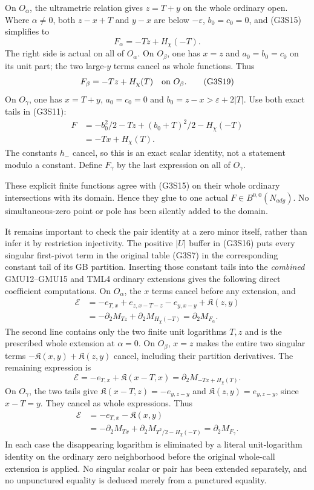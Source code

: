 On $O_\alpha$, the ultrametric relation gives $z=T+y$ on the whole
ordinary open.  Where $\alpha\ne0$, both $z-x+T$ and $y-x$ are
below $-\varepsilon$, $b_0=c_0=0$, and (G3S15) simplifies to
\[
                 F_\alpha=-Tz+H_\chi(-T).
 \tag{G3S18}
\]
The right side is actual on all of $O_\alpha$.
On $O_\beta$, one has $x=z$ and $a_0=b_0=c_0$ on its unit part;
the two large-$y$ terms cancel as whole functions.  Thus
\[
                 F_\beta=-Tz+H_\chi(T)
                           \quad\hbox{on }O_\beta.
 \tag{G3S19}
\]
On $O_\gamma$, one has $x=T+y$, $a_0=c_0=0$ and
$b_0=z-x>\varepsilon+2|T|$.  Use both exact tails in (G3S11):
\[
 \begin{split}
 F&=-b_0^2/2-Tz+(b_0+T)^2/2-H_\chi(-T)\\
  &=-Tx+H_\chi(T).
 \end{split}
 \tag{G3S20}
\]
The constants $h_-$ cancel, so this is an exact scalar identity,
not a statement modulo a constant.  Define $F_\gamma$ by the last
expression on all of $O_\gamma$.

These explicit finite functions agree with (G3S15) on their whole
ordinary intersections with its domain.  Hence they glue to one
actual $F\in B^{0,0}(N_{adg})$.  No simultaneous-zero point or
pole has been silently added to the domain.

It remains important to check the pair identity at a zero minor
itself, rather than infer it by restriction injectivity.  The
positive $|U|$ buffer in (G3S16) puts every singular first-pivot
term in the original table (G3S7) in the corresponding constant
tail of its GB partition.  Inserting those constant tails into the
\emph{combined} GMU12--GMU15 and TML4 ordinary extensions gives
the following direct coefficient computations.
On $O_\alpha$, the $x$ terms cancel before any extension, and
\[
 \begin{split}
 \mathcal E
   &=-e_{T,x}+e_{z,x-T-z}-e_{y,x-y}+\mathfrak K(z,y)\\
   &=-\partial_2M_{Tz}+\partial_2M_{H_\chi(-T)}
                       =\partial_2M_{F_\alpha}.
 \end{split}
 \tag{G3S21}
\]
The second line contains only the two finite unit logarithms
$T,z$ and is the prescribed whole extension at $\alpha=0$.
On $O_\beta$, $x=z$ makes the entire two singular terms
$-\mathfrak K(x,y)+\mathfrak K(z,y)$ cancel, including their
partition derivatives.  The remaining expression is
\[
 \mathcal E=-e_{T,x}+\mathfrak K(x-T,x)
                =\partial_2M_{-Tx+H_\chi(T)}.
 \tag{G3S22}
\]
On $O_\gamma$, the two tails give
$\mathfrak K(x-T,z)=-e_{y,z-y}$ and
$\mathfrak K(z,y)=e_{y,z-y}$, since $x-T=y$.
They cancel as whole expressions.  Thus
\[
 \begin{split}
 \mathcal E&=-e_{T,x}-\mathfrak K(x,y)\\
   &=-\partial_2M_{Tx}+\partial_2M_{T^2/2-H_\chi(-T)}
                      =\partial_2M_{F_\gamma}.
 \end{split}
 \tag{G3S23}
\]
In each case the disappearing logarithm is eliminated by a literal
unit-logarithm identity on the ordinary zero neighborhood before
the original whole-call extension is applied.  No singular scalar
or pair has been extended separately, and no unpunctured equality
is deduced merely from a punctured equality.

